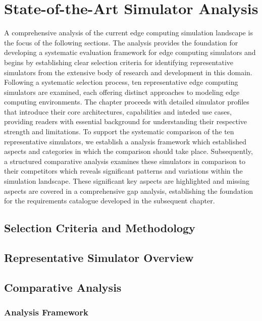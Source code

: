 \chapter{State-of-the-Art Simulator Analysis}
A comprehensive analysis of the current edge computing simulation landscape is the focus of the following sections.
The analysis provides the foundation for developing a systematic evaluation framework for edge computing simulators and begins by establishing
clear selection criteria for identifying representative simulators from the extensive body of research and development in this domain.
Following a systematic selection process, ten representative edge computing simulators are examined, each offering distinct approaches to modeling edge computing environments.
The chapter proceeds with detailed simulator profiles that introduce their core architectures, capabilities and inteded use cases, providing readers with essential background for understanding their respective strength and limitations.
To support the systematic comparison of the ten representative simulators, we establish a analysis framework which established aspects and categories in which the comparison should take place.
Subsequently, a structured comparative analysis examines these simulators in comparison to their competitors which reveals significant patterns and variations within the simulation landscape.
These significant key aspects are highlighted and missing aspects are covered in a comprehensive gap analysis, establishing the foundation for the requirements catalogue developed in the subsequent chapter.

\section{Selection Criteria and Methodology}
\section{Representative Simulator Overview}
\section{Comparative Analysis}
\subsection{Analysis Framework}
